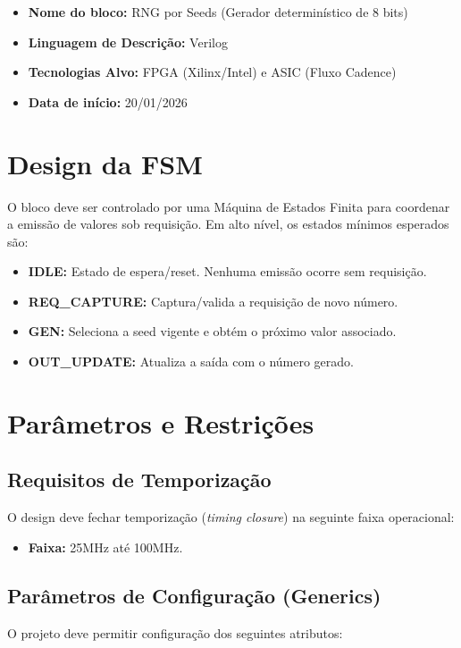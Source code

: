 \documentclass[12pt, a4paper]{article}
\begin{document}
	\begin{itemize}
		\item \textbf{Nome do bloco:} RNG por Seeds (Gerador determinístico de 8 bits)
		\item \textbf{Linguagem de Descrição:} Verilog
		\item \textbf{Tecnologias Alvo:} FPGA (Xilinx/Intel) e ASIC (Fluxo Cadence)
		\item \textbf{Data de início:} 20/01/2026
	\end{itemize}
	
	\section{Design da FSM}
	O bloco deve ser controlado por uma Máquina de Estados Finita para coordenar a emissão de valores sob requisição. Em alto nível, os estados mínimos esperados são:
	
	\begin{itemize}
		\item \textbf{IDLE:} Estado de espera/reset. Nenhuma emissão ocorre sem requisição.
		\item \textbf{REQ\_CAPTURE:} Captura/valida a requisição de novo número.
		\item \textbf{GEN:} Seleciona a seed vigente e obtém o próximo valor associado.
		\item \textbf{OUT\_UPDATE:} Atualiza a saída com o número gerado.
	\end{itemize}
	
	\section{Parâmetros e Restrições}
	
	\subsection{Requisitos de Temporização}
	O design deve fechar temporização (\textit{timing closure}) na seguinte faixa operacional:
	\begin{itemize}
		\item \textbf{Faixa:} 25MHz até 100MHz.
	\end{itemize}
	
	\subsection{Parâmetros de Configuração (Generics)}
	O projeto deve permitir configuração dos seguintes atributos:
	
\end{document}
